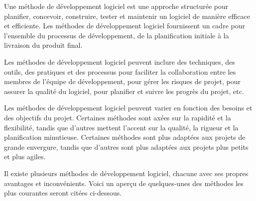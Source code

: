
Une méthode de développement logiciel est une approche structurée pour planifier, concevoir, construire, tester et maintenir un logiciel de manière efficace et efficiente. Les méthodes de développement logiciel fournissent un cadre pour l'ensemble du processus de développement, de la planification initiale à la livraison du produit final.

Les méthodes de développement logiciel peuvent inclure des techniques, des outils, des pratiques et des processus pour faciliter la collaboration entre les membres de l'équipe de développement, pour gérer les risques de projet, pour assurer la qualité du logiciel, pour planifier et suivre les progrès du projet, etc.

Les méthodes de développement logiciel peuvent varier en fonction des besoins et des objectifs du projet. Certaines méthodes sont axées sur la rapidité et la flexibilité, tandis que d'autres mettent l'accent sur la qualité, la rigueur et la planification minutieuse. Certaines méthodes sont plus adaptées aux projets de grande envergure, tandis que d'autres sont plus adaptées aux projets plus petits et plus agiles.

Il existe plusieurs méthodes de développement logiciel, chacune avec ses propres avantages et inconvénients. Voici un aperçu de quelques-unes des méthodes les plus courantes seront citées ci-dessous.

